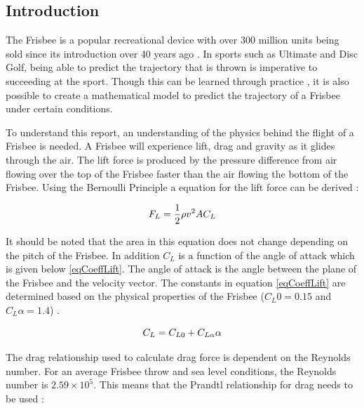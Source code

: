 \documentclass[12pt,twoside,letterpaper]{article}
\begin{document}
\begin{multicols}{2}

\section{Introduction}
\setlength{\parindent}{5ex}
The Frisbee is a popular recreational device with over 300  million units being sold since its introduction over 40 years ago \cite{Sheppard}. In sports such as Ultimate and Disc Golf, being able to predict the trajectory that is thrown is imperative to succeeding at the sport. Though this can be learned through practice , it is also possible to create a mathematical model to predict the trajectory of a Frisbee under certain conditions.\par
To understand this report, an understanding of the physics behind the flight of a Frisbee is needed. A Frisbee will experience lift, drag and gravity as it glides through the air. The lift force is produced by the pressure difference from air flowing over the top of the Frisbee faster than the air flowing the bottom of the Frisbee. Using the Bernoulli Principle a equation for the lift force can be derived \cite{Morrison2005}:


\begin{equation}
\centering
F_{L} = \frac{1}{2}\rho v^2 A C_{L}
\label{eqLiftForce}
\end{equation}

It should be noted that the area in this equation does not change depending on the pitch of the Frisbee. In addition $C_{L}$ is a function of the angle of attack which is given below \eqref{eqCoeffLift}. The angle of attack is the angle between the plane of the Frisbee and the velocity vector. The constants in equation \eqref{eqCoeffLift} are determined based on the physical properties of the Frisbee ($C_L0 = 0.15$ and $C_L\alpha = 1.4$) \cite{Morrison2005}.

\begin{equation}
\centering
C_{L} = C_{L0} + C_{L\alpha} \alpha 
\label{eqCoeffLift}
\end{equation}

The drag relationship used to calculate drag force is dependent on the Reynolds number. For an average Frisbee throw and sea level conditions, the Reynolds number is $2.59\times 10^5$. This means that the Prandtl relationship for drag needs to be used \cite{Morrison2005}: 


\end{multicols}
\end{document}
